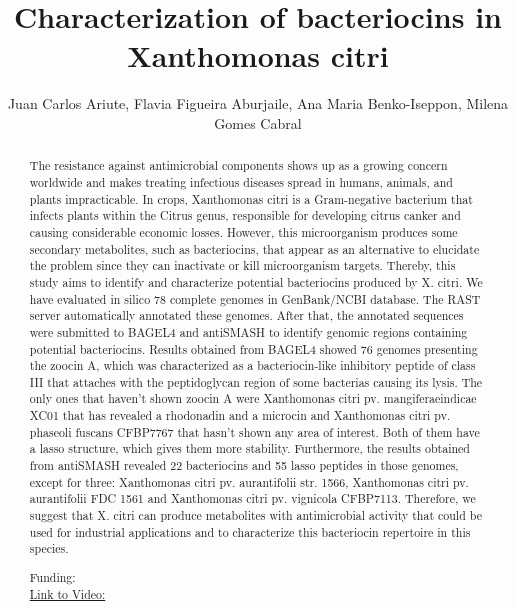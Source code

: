 \documentclass[twoside]{article}
\title{\vspace{-15mm}\fontsize{24pt}{10pt}\selectfont\textbf{ Characterization of bacteriocins in Xanthomonas citri }} %
\author{ Juan Carlos Ariute,  Flavia Figueira Aburjaile,  Ana Maria Benko-Iseppon,  Milena Gomes Cabral }
\affil{ IOC/Fiocruz,  UNIVERSIDADE FEDERAL DE PERNAMBUCO }
\date{}
\begin{document}
  
  
  \maketitle %
  
  
  \thispagestyle{fancy} %
  
  
  \begin{abstract}
  The resistance against antimicrobial components shows up as a growing concern worldwide and makes treating infectious diseases spread in humans,  animals,  and plants impracticable. In crops,  Xanthomonas citri is a Gram-negative bacterium that infects plants within the Citrus genus,  responsible for developing citrus canker and causing considerable economic losses. However,  this microorganism produces some secondary metabolites,  such as bacteriocins,  that appear as an alternative to elucidate the problem since they can inactivate or kill microorganism targets. Thereby,  this study aims to identify and characterize potential bacteriocins produced by X. citri. We have evaluated in silico 78 complete genomes in GenBank/NCBI database. The RAST server automatically annotated these genomes. After that,  the annotated sequences were submitted to BAGEL4 and antiSMASH to identify genomic regions containing potential bacteriocins. Results obtained from BAGEL4 showed 76 genomes presenting the zoocin A,  which was characterized as a bacteriocin-like inhibitory peptide of class III that attaches with the peptidoglycan region of some bacterias causing its lysis. The only ones that haven't shown zoocin A were Xanthomonas citri pv. mangiferaeindicae XC01 that has revealed a rhodonadin and a microcin and Xanthomonas citri pv. phaseoli fuscans CFBP7767 that hasn't shown any area of interest. Both of them have a lasso structure,  which gives them more stability. Furthermore,  the results obtained from antiSMASH revealed 22 bacteriocins and 55 lasso peptides in those genomes,  except for three: Xanthomonas citri pv. aurantifolii str. 1566,  Xanthomonas citri pv. aurantifolii FDC 1561 and Xanthomonas citri pv. vignicola CFBP7113. Therefore,  we suggest that X. citri can produce metabolites with antimicrobial activity that could be used for industrial applications and to characterize this bacteriocin repertoire in this species.
  
  Funding:  \\
  \href{http://ab3c.org.br/xpress_pres2020/xmxp2020-301064.html}{Link to Video:}

  \end{abstract}
   
  
\end{document}
